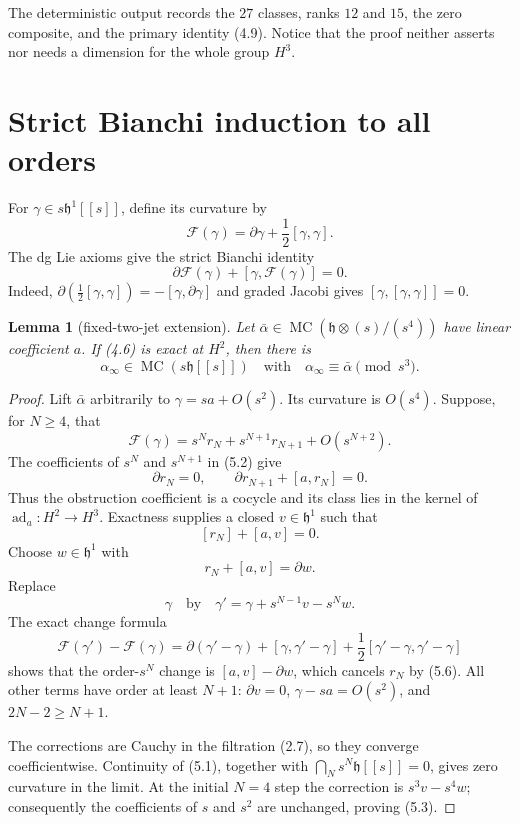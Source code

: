 \documentclass[11pt]{article}
\newtheorem{lemma}[theorem]{Lemma}
\theoremstyle{definition}
\theoremstyle{remark}
\newcommand{\MC}{\operatorname{MC}}
\newcommand{\ad}{\operatorname{ad}}
\begin{document}
The deterministic output
 records the $27$
classes, ranks $12$ and $15$, the zero composite, and the primary identity
(4.9).  Notice that the proof neither asserts nor needs a dimension for the
whole group $H^3$.

\section{Strict Bianchi induction to all orders}

For $\gamma\in s\mathfrak h^1[[s]]$, define its curvature by
\[
 \mathcal F(\gamma)=\partial\gamma+\frac12[\gamma,\gamma].   \tag{5.1}
\]
The dg Lie axioms give the strict Bianchi identity
\[
 \partial\mathcal F(\gamma)+[\gamma,\mathcal F(\gamma)]=0.  \tag{5.2}
\]
Indeed,
$\partial(\frac12[\gamma,\gamma])=-[\gamma,\partial\gamma]$
and graded Jacobi gives $[\gamma,[\gamma,\gamma]]=0$.

\begin{lemma}[fixed-two-jet extension]\label{lem:induction}
Let $\bar\alpha\in\MC(\mathfrak h\otimes(s)/(s^4))$ have linear
coefficient $a$.  If (4.6) is exact at $H^2$, then there is
\[
 \alpha_\infty\in\MC(s\mathfrak h[[s]])
 \quad\text{with}\quad
 \alpha_\infty\equiv\bar\alpha\pmod{s^3}.                  \tag{5.3}
\]
\end{lemma}

\begin{proof}
Lift $\bar\alpha$ arbitrarily to $\gamma=sa+O(s^2)$.  Its curvature is
$O(s^4)$.  Suppose, for $N\geq4$, that
\[
 \mathcal F(\gamma)=s^Nr_N+s^{N+1}r_{N+1}+O(s^{N+2}).       \tag{5.4}
\]
The coefficients of $s^N$ and $s^{N+1}$ in (5.2) give
\[
 \partial r_N=0,
 \qquad \partial r_{N+1}+[a,r_N]=0.                         \tag{5.5}
\]
Thus the obstruction coefficient is a cocycle and its class lies in the
kernel of $\ad_a:H^2\to H^3$.  Exactness supplies a closed
$v\in\mathfrak h^1$ such that
\[
 [r_N]+[a,v]=0.
\]
Choose $w\in\mathfrak h^1$ with
\[
 r_N+[a,v]=\partial w.                                      \tag{5.6}
\]
Replace
\[
 \gamma\quad\text{by}\quad
 \gamma'=\gamma+s^{N-1}v-s^Nw.                             \tag{5.7}
\]
The exact change formula
\[
 \mathcal F(\gamma')-\mathcal F(\gamma)
 =\partial(\gamma'-\gamma)+[\gamma,\gamma'-\gamma]
  +\frac12[\gamma'-\gamma,\gamma'-\gamma]
\]
shows that the order-$s^N$ change is $[a,v]-\partial w$, which cancels $r_N$
by (5.6).  All other terms have order at least $N+1$: $\partial v=0$,
$\gamma-sa=O(s^2)$, and $2N-2\geq N+1$.

The corrections are Cauchy in the filtration (2.7), so they converge
coefficientwise.  Continuity of (5.1), together with
$\bigcap_Ns^N\mathfrak h[[s]]=0$, gives zero curvature in the limit.  At the
initial $N=4$ step the correction is $s^3v-s^4w$; consequently the
coefficients of $s$ and $s^2$ are unchanged, proving (5.3).
\end{proof}
\end{document}
